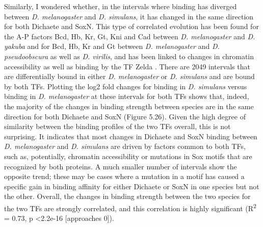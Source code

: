 Similarly, I wondered whether, in the intervals where binding has diverged between \emph{D. melanogaster} and \emph{D. simulans}, it has changed in the same direction for both Dichaete and SoxN. This type of correlated evolution has been found for the A-P factors Bcd, Hb, Kr, Gt, Kni and Cad between \emph{D. melanogaster} and \emph{D. yakuba} and for Bcd, Hb, Kr and Gt between \emph{D. melanogaster} and \emph{D. pseudoobscura} as well as \emph{D. virilis}, and has been linked to changes in chromatin accessibility as well as binding by the TF Zelda \citep{bradley_binding_2010,paris_extensive_2013}. There are 2049 intervals that are differentially bound in either \emph{D. melanogaster} or \emph{D. simulans} and are bound by both TFs. Plotting the log2 fold changes for binding in \emph{D. simulans} versus binding in \emph{D. melanogaster} at these intervals for both TFs shows that, indeed, the majority of the changes in binding strength between species are in the same direction for both Dichaete and SoxN (Figure 5.26). Given the high degree of similarity between the binding profiles of the two TFs overall, this is not surprising. It indicates that most changes in Dichaete and SoxN binding between \emph{D. melanogaster} and \emph{D. simulans} are driven by factors common to both TFs, such as, potentially, chromatin accessibility or mutations in Sox motifs that are recognized by both proteins. A much smaller number of intervals show the opposite trend; these may be cases where a mutation in a motif has caused a specific gain in binding affinity for either Dichaete or SoxN in one species but not the other. Overall, the changes in binding strength between the two species for the two TFs are strongly correlated, and this correlation is highly significant (R\textsuperscript{2} = 0.73, p \textless 2.2e-16 [approaches 0]).


